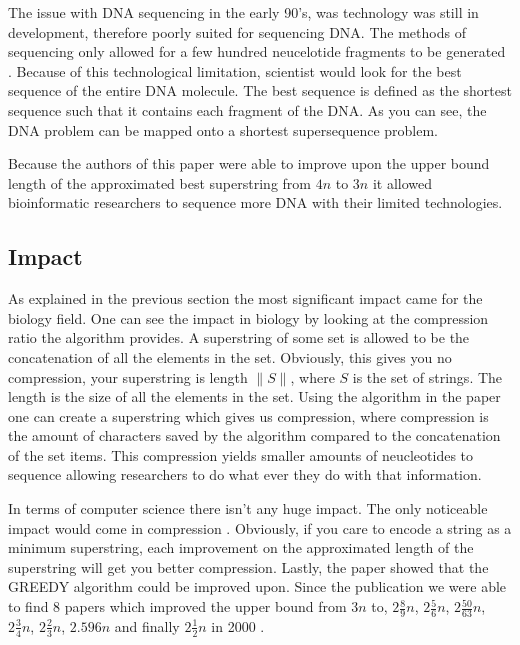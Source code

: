 \documentclass[letterpaper,11pt,titlepage]{article}
\begin{document}
The issue with DNA sequencing in the early 90's, was technology was still in development, therefore poorly suited for sequencing DNA. The methods of sequencing only allowed for a few hundred neucelotide fragments to be generated \cite{karp1993mapping}. Because of this technological limitation, scientist would look for the best sequence of the entire DNA molecule. The best sequence is defined as the shortest sequence such that it contains each fragment of the DNA. As you can see, the DNA problem can be mapped onto a shortest supersequence problem. 

Because the authors of this paper were able to improve upon the upper bound length of the approximated best superstring from $4n$ to $3n$ it allowed bioinformatic researchers to sequence more DNA with their limited technologies. 



\subsection*{Impact}
As explained in the previous section the most significant impact came for the biology field. One can see the impact in biology by looking at the compression ratio the algorithm provides. A superstring of some set is allowed to be the concatenation of all the elements in the set. Obviously, this gives you no compression, your superstring is length $\| S \|$, where $S$ is the set of strings. The length is the size of all the elements in the set. Using the algorithm in the paper one can create a superstring which gives us compression, where compression is the amount of characters saved by the algorithm compared to the concatenation of the set items. This compression yields smaller amounts of neucleotides to sequence allowing researchers to do what ever they do with that information.  

In terms of computer science there isn't any huge impact.  The only noticeable impact would come in compression \cite{storer1988data}. Obviously, if you care to encode a string as a minimum superstring, each improvement on the approximated length of the superstring will get you better compression. Lastly, the paper showed that the GREEDY algorithm could be improved upon. Since the publication we were able to find 8 papers which improved the upper bound from $3n$ to, $2 \frac{8}{9}n$, $2 \frac{5}{6}n$, $2 \frac{50}{63}n$, $2 \frac{3}{4}n$, $2 \frac{2}{3}n$, $2.596n$ and finally $2 \frac{1}{2}n$ in 2000 \cite{sweedyk2000boldmath}.
\end{document}
